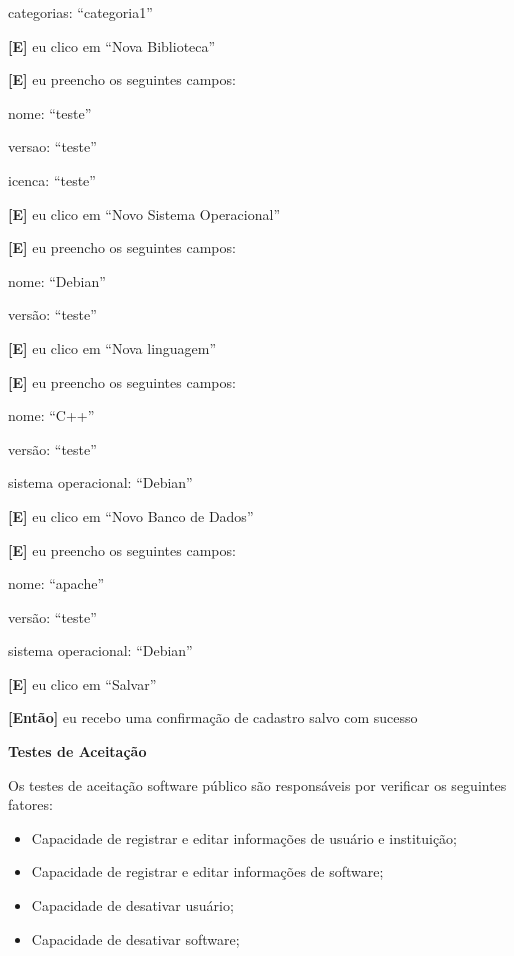 \begin{itemize}
  		\subitem categorias: ``categoria1''
 	
 	\textbf{[E]} eu clico em ``Nova Biblioteca''

 	\textbf{[E]} eu preencho os seguintes campos: 

 		\subitem nome: ``teste''

 		\subitem versao: ``teste''

 		\subitem icenca: ``teste''

 	\textbf{[E]} eu clico em ``Novo Sistema Operacional''

 	\textbf{[E]} eu preencho os seguintes campos: 

 		\subitem nome: ``Debian''

 		\subitem versão: ``teste''

 	\textbf{[E]} eu clico em ``Nova linguagem''

 	\textbf{[E]} eu preencho os seguintes campos: 

 		\subitem nome: ``C++''

 		\subitem versão: ``teste''

 		\subitem sistema operacional: ``Debian''

 	\textbf{[E]} eu clico em ``Novo Banco de Dados''

 	\textbf{[E]} eu preencho os seguintes campos: 

 		\subitem nome: ``apache''

 		\subitem versão: ``teste''

 		\subitem sistema operacional: ``Debian''

	\textbf{[E]} eu clico em ``Salvar''

	\textbf{[Então]} eu recebo uma confirmação de cadastro salvo com sucesso

\end{itemize}


\textbf{Testes de Aceitação}

Os testes de aceitação software público são responsáveis por verificar os seguintes fatores:

\begin{itemize}
	\item Capacidade de registrar e editar informações de usuário e instituição;
	\item Capacidade de registrar e editar informações de software;
	\item Capacidade de desativar usuário;
	\item Capacidade de desativar software;
\end{itemize}


